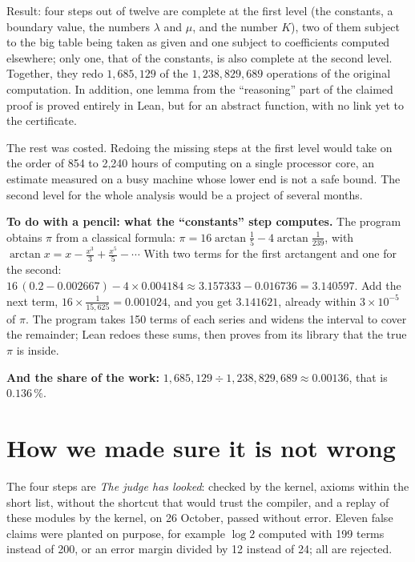 Result: four steps out of twelve are complete at the first level (the constants, a boundary
value, the numbers $\lambda$ and $\mu$, and the number $K$), two of them subject to the big table
being taken as given and one subject to coefficients computed elsewhere; only one, that of the
constants, is also complete at the second level. Together, they redo $1{,}685{,}129$ of the
$1{,}238{,}829{,}689$ operations of the original computation. In addition, one lemma from the
``reasoning'' part of the claimed proof is proved entirely in Lean, but for an abstract
function, with no link yet to the certificate.

The rest was costed. Redoing the missing steps at the first level would take on the order of 854
to 2,240 hours of computing on a single processor core, an estimate measured on a busy machine
whose lower end is not a safe bound. The second level for the whole analysis would be a project
of several months.

\begin{encadre}
\textbf{To do with a pencil: what the ``constants'' step computes.} The program obtains $\pi$ from
a classical formula:
$\pi=16\arctan\tfrac15-4\arctan\tfrac1{239}$, with
$\arctan x=x-\tfrac{x^3}{3}+\tfrac{x^5}{5}-\cdots$
With two terms for the first arctangent and one for the second:
$16\,(0.2-0.002667)-4\times0.004184\approx3.157333-0.016736=3.140597$.
Add the next term, $16\times\tfrac{1}{15{,}625}=0.001024$, and you get $3.141621$, already
within $3\times10^{-5}$ of $\pi$. The program takes 150 terms of each series and widens the
interval to cover the remainder; Lean redoes these sums, then proves from its library that the
true $\pi$ is inside.

\textbf{And the share of the work:} $1{,}685{,}129\div1{,}238{,}829{,}689\approx0.00136$, that is
$0.136\,\%$.
\end{encadre}

\section*{How we made sure it is not wrong}

The four steps are  \emph{The judge has looked}: checked by the kernel, axioms within
the short list, without the shortcut that would trust the compiler, and a replay of these modules
by the kernel, on 26 October, passed without error. Eleven false claims were planted on purpose,
for example $\log 2$ computed with 199 terms instead of 200, or an error margin divided by 12
instead of 24; all are rejected.

